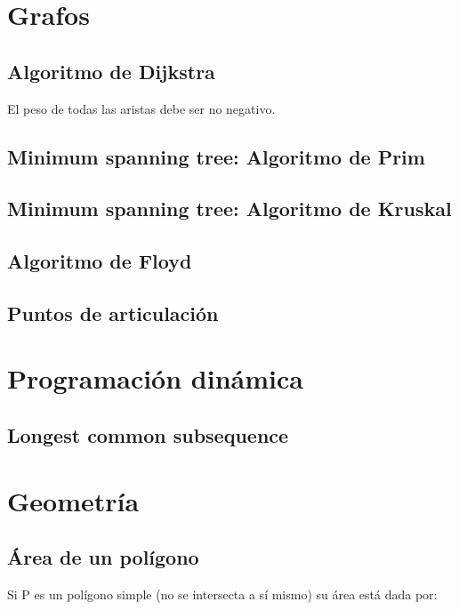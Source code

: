 \documentclass[10pt,letterpaper]{article}
\begin{document}
\bigskip



\section{Grafos}
\subsection{Algoritmo de Dijkstra}
El peso de todas las aristas debe ser no negativo.
\\

\subsection{Minimum spanning tree: Algoritmo de Prim}


\subsection{Minimum spanning tree: Algoritmo de Kruskal}

\subsection{Algoritmo de Floyd}

\subsection{Puntos de articulación}

\section{Programación dinámica}
\subsection{Longest common subsequence}

\section{Geometría}
\subsection{Área de un polígono}
Si P es un polígono simple (no se intersecta a sí mismo) su área está dada por: \\
\end{document}
